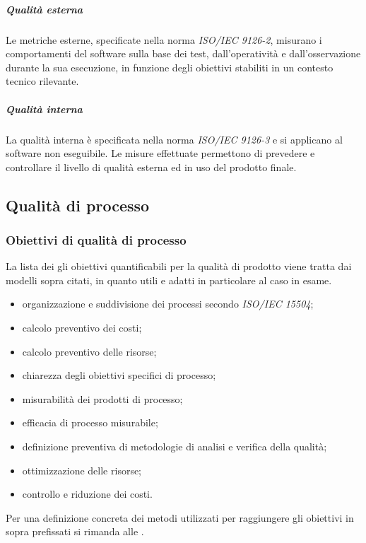 \documentclass[12pt,a4paper]{article}
\begin{document}
	\subparagraph{Qualità esterna}
	Le metriche esterne, specificate nella norma \textit{ISO/IEC 9126-2}, misurano i comportamenti del software sulla base dei test, dall'operatività e dall'osservazione durante la sua esecuzione, in funzione degli obiettivi stabiliti in un contesto tecnico rilevante.
	
	\subparagraph{Qualità interna}
	La qualità interna è specificata nella norma \textit{ISO/IEC 9126-3} e si applicano al software non eseguibile. Le misure effettuate permettono di prevedere e controllare il livello di qualità esterna ed in uso del prodotto finale.
	
	\subsection{Qualità di processo}
	
	\subsubsection{Obiettivi di qualità di processo}
	La lista dei gli obiettivi quantificabili per la qualità di prodotto viene tratta dai modelli sopra citati, in quanto utili e adatti in particolare al caso in esame.
	\begin{itemize}
		\item organizzazione e suddivisione dei processi secondo \textit{ISO/IEC 15504};
		\item calcolo preventivo dei costi;
		\item calcolo preventivo delle risorse;
		\item chiarezza degli obiettivi specifici di processo;
		\item misurabilità dei prodotti di processo;
		\item efficacia di processo misurabile;
		\item definizione preventiva di metodologie di analisi e verifica della qualità;
		\item ottimizzazione delle risorse;
		\item controllo e riduzione dei costi.
	\end{itemize}
	Per una definizione concreta dei metodi utilizzati per raggiungere gli obiettivi in sopra prefissati si rimanda alle \NdP{}.
	
\end{document}
